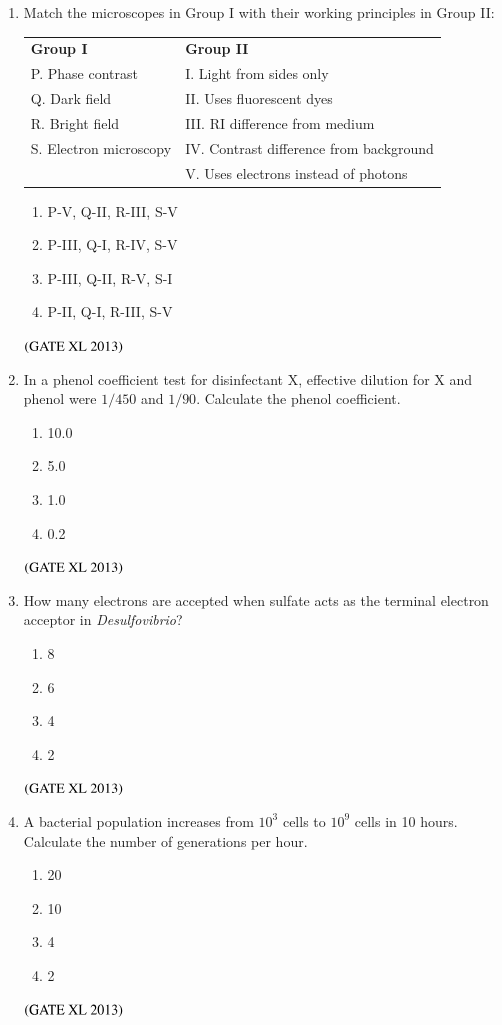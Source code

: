 \documentclass[journal]{IEEEtran}
\begin{document}
\begin{enumerate}
\begin{enumerate}
\item Match the microscopes in Group I with their working principles in Group II:  
\begin{tabular}{ll}
\textbf{Group I} & \textbf{Group II} \\
P. Phase contrast & I. Light from sides only \\
Q. Dark field & II. Uses fluorescent dyes \\
R. Bright field & III. RI difference from medium \\
S. Electron microscopy & IV. Contrast difference from background \\
& V. Uses electrons instead of photons \\
\end{tabular}
\begin{enumerate}
\item P-V, Q-II, R-III, S-V
\item P-III, Q-I, R-IV, S-V
\item P-III, Q-II, R-V, S-I
\item P-II, Q-I, R-III, S-V
\end{enumerate}
\hfill $\left(\text{GATE XL 2013}\right)$

\item In a phenol coefficient test for disinfectant X, effective dilution for X and phenol were $1/450$ and $1/90$. Calculate the phenol coefficient.
\begin{enumerate}
\item 10.0
\item 5.0
\item 1.0
\item 0.2
\end{enumerate}
\hfill $\left(\text{GATE XL 2013}\right)$

\item How many electrons are accepted when sulfate acts as the terminal electron acceptor in \textit{Desulfovibrio}?
\begin{enumerate}
\item 8
\item 6
\item 4
\item 2
\end{enumerate}
\hfill $\left(\text{GATE XL 2013}\right)$

\item A bacterial population increases from $10^3$ cells to $10^9$ cells in 10 hours. Calculate the number of generations per hour.
\begin{enumerate}
\item 20
\item 10
\item 4
\item 2
\end{enumerate}
\hfill $\left(\text{GATE XL 2013}\right)$
\end{enumerate}
\clearpage

\end{enumerate}
\end{document}
